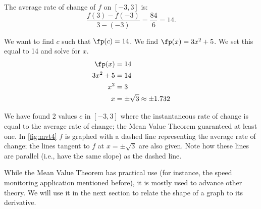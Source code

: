 {The average rate of change of $f$ on $[-3,3]$ is:
		\[\frac{f(3)-f(-3)}{3-(-3)} = \frac{84}{6} = 14.\]
		
We want to find $c$ such that $\fp(c) = 14$. We find $\fp(x) = 3x^2+5$. We set this equal to 14 and solve for $x$. 
		\begin{align*}
		\fp(x) &= 14 \\
		3x^2 +5 &= 14\\
		x^2  &= 3\\
		x &= \pm \sqrt{3} \approx \pm 1.732
		\end{align*}
		

We have found 2 values $c$ in $[-3,3]$ where the instantaneous rate of change is equal to the average rate of change; the Mean Value Theorem guaranteed at least one. In \autoref{fig:mvt4} $f$ is graphed with a dashed line representing the average rate of change; the lines tangent to $f$ at $x=\pm \sqrt{3}$ are also given. Note how these lines are parallel (i.e., have the same slope) as the dashed line.}

While the Mean Value Theorem has practical use (for instance, the speed monitoring application mentioned before), it is mostly used to advance other theory. We will use it in the next section to relate  the shape of a graph to its derivative.

%


